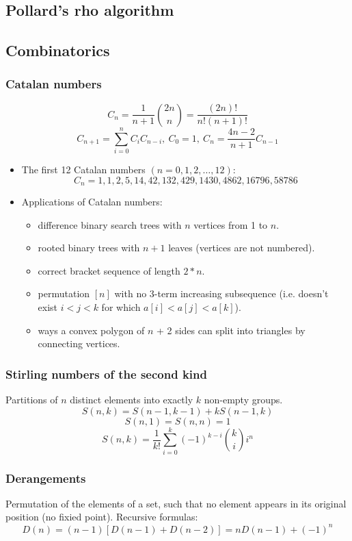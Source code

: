 \subsection{Pollard's rho algorithm}

\subsection{Combinatorics}
\subsubsection{Catalan numbers}
\[ C_n = \frac{1}{n + 1} {2n \choose n} = \frac{(2n)!}{n!(n+1)!}\]
\[ C_{n + 1} = \displaystyle\sum_{i = 0}^{n}C_i C_{n - i},\ C_0 = 1,\ C_n = \frac{4n - 2}{n + 1}C_{n - 1}\]
\begin{itemize}
	\item The first 12 Catalan numbers $(n = 0, 1, 2, \ldots, 12)$: 
	\[ C_n = 1, 1, 2, 5, 14, 42, 132, 429, 1430, 4862, 16796, 58786 \]
	\item Applications of Catalan numbers:
	\begin{itemize}
		\item difference binary search trees with $n$ vertices from 1 to $n$. 
		\item rooted binary trees with $n + 1$ leaves (vertices are not numbered).
		\item correct bracket sequence of length $2 * n$.
		\item permutation $[n]$ with no 3-term increasing subsequence (i.e. doesn't exist $i < j < k$ for which $a[i] < a[j] < a[k]$).
		\item ways a convex polygon of $n$ + 2 sides can split into triangles by connecting vertices. 
	\end{itemize}
\end{itemize}

\subsubsection{Stirling numbers of the second kind}
Partitions of $n$ distinct elements into exactly $k$ non-empty groups.
\[ S(n, k) = S(n - 1, k - 1) + kS(n - 1, k)\]
\[ S(n, 1) = S(n, n) = 1 \]
\[ S(n, k) = \frac{1}{k!} \sum\limits_{i = 0}^{k} (-1)^{k - i} {k \choose i} i^n\]

\subsubsection{Derangements}
Permutation of the elements of a set, such that no element appears in its original position (no fixied point). Recursive formulas:
\[D(n) = (n - 1)[D(n - 1) + D(n - 2)] = nD(n - 1) + (-1)^n\]
	